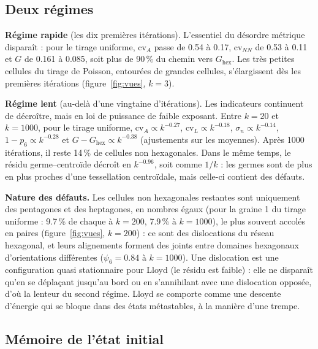 \documentclass[10pt,a4paper]{article}
\begin{document}
\begin{table}[H]
  \centering
  
  \caption{Valeurs moyennes (5 graines) à quelques points de contrôle.}
  \label{tab:valeurs}
\end{table}

\subsection{Deux régimes}

\textbf{Régime rapide} (les dix premières itérations). L'essentiel du désordre métrique disparaît : pour le
tirage uniforme, $\mathrm{cv}_A$ passe de 0.54 à 0.17, $\mathrm{cv}_{NN}$ de 0.53 à 0.11 et $G$ de 0.161 à 0.085,
soit plus de 90\,\% du chemin vers $G_{\mathrm{hex}}$. Les très petites cellules du tirage de Poisson, entourées de
grandes cellules, s'élargissent dès les premières itérations (figure~\ref{fig:vues}, $k=3$).

\textbf{Régime lent} (au-delà d'une vingtaine d'itérations). Les indicateurs continuent de décroître, mais en loi
de puissance de faible exposant. Entre $k=20$ et $k=1000$, pour le tirage uniforme,
$\mathrm{cv}_A\propto k^{-0.27}$, $\mathrm{cv}_L\propto k^{-0.18}$, $\sigma_n\propto k^{-0.14}$,
$1-p_6\propto k^{-0.28}$ et $G-G_{\mathrm{hex}}\propto k^{-0.38}$ (ajustements sur les moyennes). Après 1000
itérations, il reste 14\,\% de cellules non hexagonales. Dans le même temps, le résidu germe--centroïde décroît
en $k^{-0.96}$, soit comme $1/k$ : les germes sont de plus en plus proches d'une tessellation centroïdale, mais
celle-ci contient des défauts.

\textbf{Nature des défauts.} Les cellules non hexagonales restantes sont uniquement des pentagones et des
heptagones, en nombres égaux (pour la graine 1 du tirage uniforme : 9.7\,\% de chaque à $k=200$, 7.9\,\% à
$k=1000$), le plus souvent accolés en paires (figure~\ref{fig:vues}, $k=200$) : ce sont des dislocations du
réseau hexagonal, et leurs
alignements forment des joints entre domaines hexagonaux d'orientations différentes ($\psi_6=0.84$ à $k=1000$).
Une dislocation est une configuration quasi stationnaire pour Lloyd (le résidu est faible) : elle ne disparaît
qu'en se déplaçant jusqu'au bord ou en s'annihilant avec une dislocation opposée, d'où la lenteur du second
régime. Lloyd se comporte comme une descente d'énergie qui se bloque dans des états métastables, à la
manière d'une trempe.

\subsection{Mémoire de l'état initial}
\end{document}
